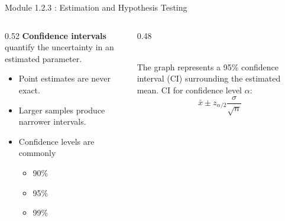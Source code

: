 \documentclass{beamer}
\begin{document}
\begin{frame}{Module 1.2.3 : Estimation and Hypothesis Testing}
\begin{columns}[T]
\begin{column}{0.52\textwidth}
\small
\textbf{Confidence intervals} quantify the uncertainty in an estimated parameter.
\begin{itemize}
\small
\item Point estimates are never exact.
\item Larger samples produce narrower intervals.
\item Confidence levels are commonly
\begin{itemize}
\small
\item 90\%
\item 95\%
\item 99\%
\end{itemize}
\end{itemize}
\end{column}
\begin{column}{0.48\textwidth}
\small
{} \\
The graph represents a 95\% confidence interval (CI) surrounding the estimated mean.  CI for confidence level $\alpha$:
\begin{equation}
\bar{x}\pm
z_{\alpha/2}\frac{\sigma}{\sqrt n}
\end{equation}
\end{column}
\end{columns}
\end{frame}
\end{document}
